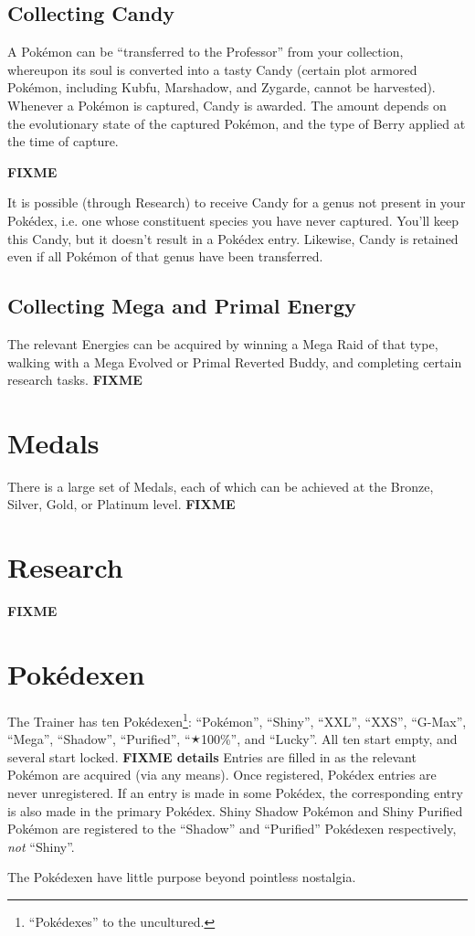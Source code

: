 \subsection{Collecting Candy}
\label{subsec:getcandy}
A Pokémon can be ``transferred to the Professor'' from your collection,
 whereupon its soul is converted into a tasty Candy (certain plot armored
 Pokémon, including Kubfu, Marshadow, and Zygarde, cannot be harvested).
Whenever a Pokémon is captured, Candy is awarded. The amount depends on
 the evolutionary state of the captured Pokémon, and the type of Berry
 applied at the time of capture.

\textbf{FIXME}

It is possible (through Research) to receive Candy for a genus not present in
  your Pokédex, i.e. one whose constituent species you have never captured.
You'll keep this Candy, but it doesn't result in a Pokédex entry.
Likewise, Candy is retained even if all Pokémon of that genus have been transferred.
\subsection{Collecting Mega and Primal Energy}
The relevant Energies can be acquired by winning a Mega Raid of that type,
  walking with a Mega Evolved or Primal Reverted Buddy, and completing
  certain research tasks.
\textbf{FIXME}

\section{Medals}
\label{subsec:getmedals}
There is a large set of Medals, each of which can be achieved at the Bronze,
 Silver, Gold, or Platinum level.
\textbf{FIXME}

\section{Research}
\label{sec:research}
\textbf{FIXME}

\section{Pokédexen}
\label{sec:dexen}
The Trainer has ten Pokédexen\footnote{``Pokédexes'' to the uncultured.}:
  ``Pokémon'', ``Shiny'', ``XXL'', ``XXS'', ``G-Max'', ``Mega'', ``Shadow'',
  ``Purified'', ``🟉100\%'', and ``Lucky''.
All ten start empty, and several start locked.
\textbf{FIXME details}
Entries are filled in as the relevant Pokémon are acquired (via any means).
Once registered, Pokédex entries are never unregistered.
If an entry is made in some Pokédex, the corresponding entry is also made
  in the primary Pokédex.
Shiny Shadow Pokémon and Shiny Purified Pokémon are registered to the
  ``Shadow'' and ``Purified'' Pokédexen respectively, \textit{not} ``Shiny''.

The Pokédexen have little purpose beyond pointless nostalgia.
